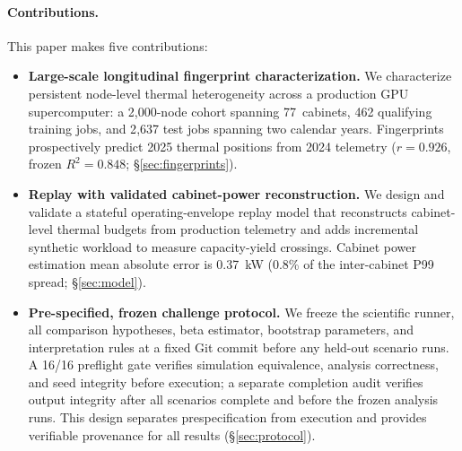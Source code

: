 \paragraph{Contributions.}
This paper makes five contributions:

\begin{itemize}

\item \textbf{Large-scale longitudinal fingerprint characterization.}
We characterize persistent node-level thermal heterogeneity across a production
GPU supercomputer: a 2{,}000-node cohort spanning 77~cabinets,
462 qualifying training jobs, and 2{,}637 test jobs spanning two calendar
years. Fingerprints prospectively predict 2025 thermal positions from 2024
telemetry ($r = 0.926$, frozen $R^2 = 0.848$; \S\ref{sec:fingerprints}).

\item \textbf{Replay with validated cabinet-power reconstruction.}
We design and validate a stateful operating-envelope replay model that
reconstructs cabinet-level thermal budgets from production telemetry and adds
incremental synthetic workload to measure capacity-yield crossings.
Cabinet power estimation mean absolute error is 0.37~kW (0.8\% of the
inter-cabinet P99 spread; \S\ref{sec:model}).

\item \textbf{Pre-specified, frozen challenge protocol.}
We freeze the scientific runner, all comparison hypotheses, beta estimator,
bootstrap parameters, and interpretation rules at a fixed Git commit before any
held-out scenario runs. A 16/16 preflight gate verifies simulation equivalence,
analysis correctness, and seed integrity before execution; a separate completion
audit verifies output integrity after all scenarios complete and before the
frozen analysis runs. This design separates prespecification from execution and
provides verifiable provenance for all results (\S\ref{sec:protocol}).


\end{itemize}
